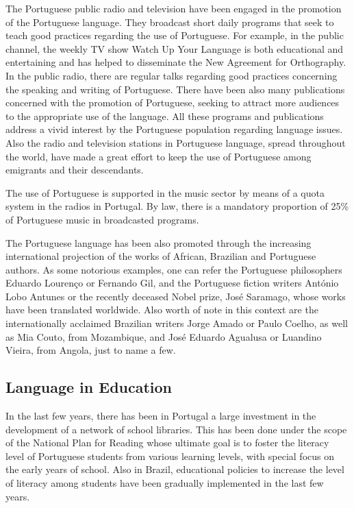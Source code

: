 \begin{multicols}{2}
The Portuguese public radio and television have been engaged in the promotion of the Portuguese language. They broadcast short daily programs 
that seek to teach good practices regarding the use of Portuguese. For example, in the public channel, the weekly TV show Watch Up Your Language is both educational and entertaining 
and has helped to disseminate the New Agreement for Orthography. 
In the public radio, there are regular talks regarding good practices concerning the speaking and writing of Portuguese. 
There have been also many publications concerned with the promotion of Portuguese, seeking to attract more audiences to the appropriate use of the language. 
All these programs and publications address a vivid interest by the Portuguese population regarding language issues. Also the radio and television stations in Portuguese language, spread throughout the world, have made a great effort to keep the use of Portuguese among emigrants and their descendants.

The use of Portuguese is supported in the music sector by means of a quota system in the radios in Portugal. 
By law, there is a mandatory proportion of 25\% of Portuguese music in broadcasted programs.


The Portuguese language has been also promoted through the increasing international projection of the works of African, Brazilian and Portuguese authors. 
As some notorious examples, one can refer the Portuguese philosophers Eduardo Lourenço or Fernando Gil, and the Portuguese fiction writers António Lobo Antunes or the recently deceased Nobel prize, José Saramago, whose works have been translated worldwide. 
Also worth of note in this context are the internationally acclaimed Brazilian writers Jorge Amado or Paulo Coelho, 
as well as Mia Couto, from Mozambique,  and José Eduardo Agualusa or Luandino Vieira, from Angola, just to name a few.

\subsection{Language in Education}

In the last few years, there has been in Portugal a large investment in the development of a network of school libraries. 
This has been done under the scope of the National Plan for Reading whose ultimate goal is to foster the literacy level of Portuguese students from various learning levels, with special focus on the early years of school. Also in Brazil, educational policies to increase the level of literacy among students have been gradually implemented in the last few years.


\end{multicols}

